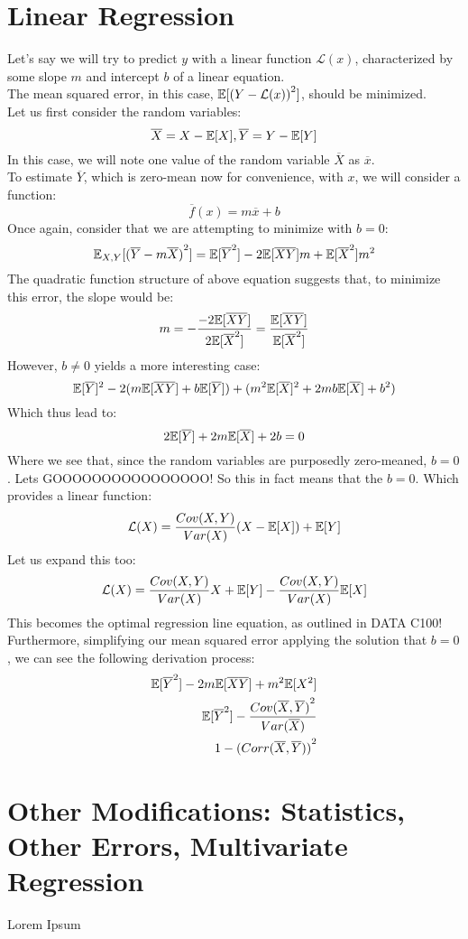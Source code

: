 \section{Linear Regression}
Let's say we will try to predict $y$ with a linear function $\mathcal{L}(x)$, characterized by some slope $m$ and intercept $b$ of a linear equation. \\
The mean squared error, in this case, $\mathbb{E}[{(Y - \mathcal{L}(x))} ^ 2]$, should be minimized. \\
Let us first consider the random variables:
\[\overline{X} = X - \mathbb{E}[X], \overline{Y} = Y - \mathbb{E}[Y]\]
In this case, we will note one value of the random variable $\overline{X}$ as $\overline{x}$. \\
To estimate $\overline{Y}$, which is zero-mean now for convenience, with $x$, we will consider a function:
\[\overline{f}(x) = m \overline{x} + b\]
Once again, consider that we are attempting to minimize with $b = 0$:
\[\mathbb{E}_{X, Y}[{(\overline{Y} - m \overline{X})}^2] = \mathbb{E}[\overline{Y}^2] - 2 \mathbb{E}[\overline{X} \overline{Y}]m + \mathbb{E}[\overline{X}^2]m^2\]
The quadratic function structure of above equation suggests that, to minimize this error, the slope would be:
\[m = -\frac{-2\mathbb{E}[\overline{X} \overline{Y}]}{2 \mathbb{E}[\overline{X}^2]} = \frac{\mathbb{E}[\overline{X} \overline{Y}]}{\mathbb{E}[\overline{X}^2]}\]
However, $b \neq 0$ yields a more interesting case:
\[
    \mathbb{E}[\overline{Y}]^2 - 2(m \mathbb{E}[\overline{X} \overline{Y}] + b \mathbb{E}[\overline{Y}]) + (m^2 \mathbb{E}[\overline{X}]^2 + 2mb\mathbb{E}[\overline{X}] + b^2)
\]
Which thus lead to:
\[
    2\mathbb{E}[\overline{Y}] + 2m\mathbb{E}[\overline{X}] + 2b = 0
\]
Where we see that, since the random variables are purposedly zero-meaned, $b = 0$. Lets GOOOOOOOOOOOOOOOO!
So this in fact means that the $b = 0$. Which provides a linear function:
\[
    \mathcal{L}(X) = \frac{Cov(X, Y)}{Var(X)}(X - \mathbb{E}[X]) + \mathbb{E}[Y]
\]
Let us expand this too:
\[
    \mathcal{L}(X) = \frac{Cov(X, Y)}{Var(X)}X + \mathbb{E}[Y] - \frac{Cov(X, Y)}{Var(X)}\mathbb{E}[X]
\]
This becomes the optimal regression line equation, as outlined in DATA C100! \\
Furthermore, simplifying our mean squared error applying the solution that $b = 0$, we can see the following derivation process:
\begin{align*}
    \mathbb{E}[\overline{Y} ^ 2] - 2m\mathbb{E}[\overline{X} \overline{Y}] + m^2 \mathbb{E}[X^2] \\
    \mathbb{E}[\overline{Y} ^ 2] - \frac{{Cov(\overline{X}, \overline{Y})} ^ 2}{Var(\overline{X})} \\
    1 - {(Corr(\overline{X}, \overline{Y}))} ^ 2
\end{align*}

\section{Other Modifications: Statistics, Other Errors, Multivariate Regression}
Lorem Ipsum

